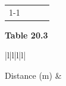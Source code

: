 {{\begin{center}
\begin{tabular}[t]{|l|l|l|l|}
         &
    
    
         &
    
    
     \tabularnewline\cline{1-1}\cline{2-2}\cline{3-3}\cline{4-4}
    \end{tabular}
      \end{center}
    \begin{center}{\small\bfseries Table 20.3}\end{center}
    
    \addtocounter{footnote}{-0}
    
          }{ %
        
    
        \begin{center}
      
      \label{m38795*id71419}
      
    \noindent
      \tablelasttail{}
      \begin{xtabular}[t]{|l|l|l|l|}\hline
    
    
        Distance (m) &
     \tabularnewline{}
    

\end{xtabular}
\end{center}}}
